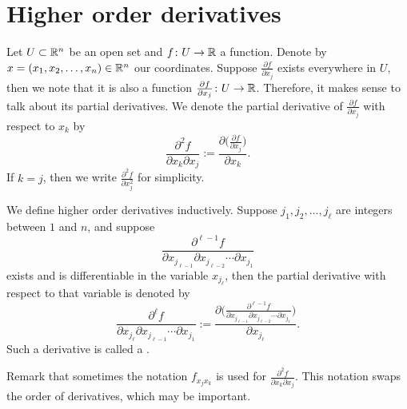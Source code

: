 
\sectionnewpage
\section{Higher order derivatives}
\label{sec:mvhighordders}


Let $U \subset {\mathbb{R}}^n$ be an open set and $f \colon U \to {\mathbb{R}}$ a function.
Denote by $x = (x_1,x_2,\ldots,x_n) \in {\mathbb{R}}^n$ our coordinates.
Suppose $\frac{\partial f}{\partial x_j}$ exists everywhere in $U$,
then we note that it is also a function $\frac{\partial f}{\partial x_j}
\colon U \to {\mathbb{R}}$.  Therefore, it makes sense to talk about its partial
derivatives.  We denote 
the partial derivative of $\frac{\partial f}{\partial x_j}$ with respect to
$x_k$ by
\begin{equation*}
\frac{\partial^2 f}{\partial x_k \partial x_j}
:=
\frac{\partial \bigl( \frac{\partial f}{\partial x_j} \bigr)}{\partial x_k} .
\end{equation*}
If $k=j$, then we write 
$\frac{\partial^2 f}{\partial x_j^2}$ for simplicity.

We define higher order derivatives inductively.
Suppose $j_1,j_2,\ldots,j_\ell$ are integers between $1$ and $n$, and
suppose 
\begin{equation*}
\frac{\partial^{\ell-1} f}{\partial x_{j_{\ell-1}} \partial x_{j_{\ell-2}} \cdots \partial x_{j_1}}
\end{equation*}
exists and is differentiable in the variable $x_{j_{\ell}}$, then the
partial derivative with respect to that variable is denoted by
\begin{equation*}
\frac{\partial^{\ell} f}{\partial x_{j_{\ell}} \partial x_{j_{\ell-1}}
\cdots \partial x_{j_1}}
:= 
\frac{\partial \bigl( \frac{\partial^{\ell-1} f}{\partial x_{j_{\ell-1}} \partial
x_{j_{\ell-2}} \cdots \partial x_{j_1}} \bigr)}{\partial x_{j_{\ell}}} .
\end{equation*}
Such a derivative is called a
\emph{}.

Remark that sometimes the notation $f_{x_j x_k}$ is used for
$\frac{\partial^2 f}{\partial x_k \partial x_j}$.  This notation
swaps the order of derivatives, which may be important.

